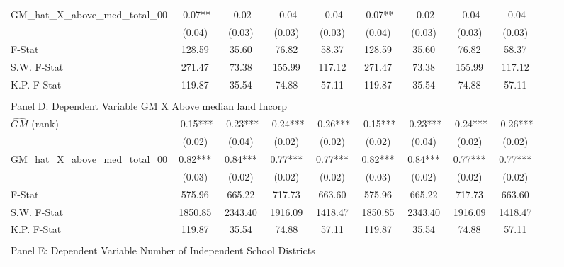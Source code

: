 \begin{table}[htbp]
\begin{threeparttable}
\begin{tabular}{l*{10}{c}}
\addlinespace
GM\_hat\_X\_above\_med\_total\_00&      -0.07** &      -0.02   &      -0.04   &      -0.04   &      -0.07** &      -0.02   &      -0.04   &      -0.04   \\
                &     (0.04)   &     (0.03)   &     (0.03)   &     (0.03)   &     (0.04)   &     (0.03)   &     (0.03)   &     (0.03)   \\
\midrule
F-Stat          &     128.59   &      35.60   &      76.82   &      58.37   &     128.59   &      35.60   &      76.82   &      58.37   \\
S.W. F-Stat     &     271.47   &      73.38   &     155.99   &     117.12   &     271.47   &      73.38   &     155.99   &     117.12   \\
K.P. F-Stat     &     119.87   &      35.54   &      74.88   &      57.11   &     119.87   &      35.54   &      74.88   &      57.11   \\
\cmidrule[\heavyrulewidth](lr){1-9} \\ \cmidrule[\heavyrulewidth](lr){1-9}
\multicolumn{8}{l}{Panel D: Dependent Variable GM X Above median land Incorp}\\
\cmidrule(lr){1-9}
$\hat{GM}$ (rank)&      -0.15***&      -0.23***&      -0.24***&      -0.26***&      -0.15***&      -0.23***&      -0.24***&      -0.26***\\
                &     (0.02)   &     (0.04)   &     (0.02)   &     (0.02)   &     (0.02)   &     (0.04)   &     (0.02)   &     (0.02)   \\
\addlinespace
GM\_hat\_X\_above\_med\_total\_00&       0.82***&       0.84***&       0.77***&       0.77***&       0.82***&       0.84***&       0.77***&       0.77***\\
                &     (0.03)   &     (0.02)   &     (0.02)   &     (0.02)   &     (0.03)   &     (0.02)   &     (0.02)   &     (0.02)   \\
\midrule
F-Stat          &     575.96   &     665.22   &     717.73   &     663.60   &     575.96   &     665.22   &     717.73   &     663.60   \\
S.W. F-Stat     &    1850.85   &    2343.40   &    1916.09   &    1418.47   &    1850.85   &    2343.40   &    1916.09   &    1418.47   \\
K.P. F-Stat     &     119.87   &      35.54   &      74.88   &      57.11   &     119.87   &      35.54   &      74.88   &      57.11   \\
\cmidrule[\heavyrulewidth](lr){1-9} \\ \cmidrule[\heavyrulewidth](lr){1-9}
\multicolumn{8}{l}{Panel E: Dependent Variable Number of Independent School Districts}\\

\end{tabular}
\end{threeparttable}
\end{table}
